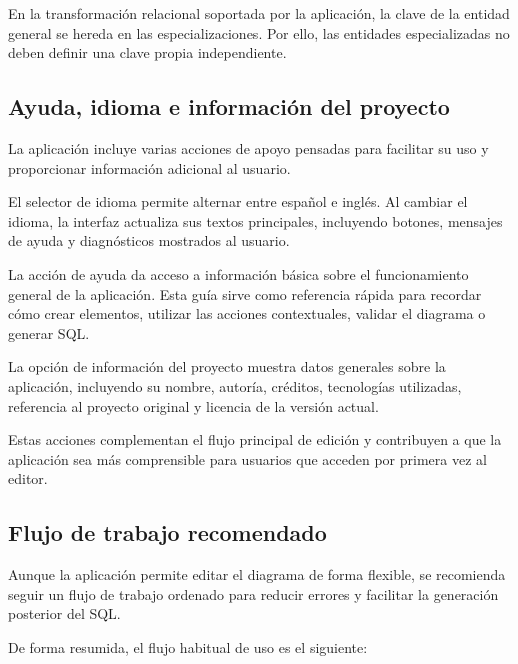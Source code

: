 En la transformación relacional soportada por la aplicación, la clave de la entidad general se hereda en las especializaciones. Por ello, las entidades especializadas no deben definir una clave propia independiente.

\subsection{Ayuda, idioma e información del proyecto}

La aplicación incluye varias acciones de apoyo pensadas para facilitar su uso y proporcionar información adicional al usuario.

El selector de idioma permite alternar entre español e inglés. Al cambiar el idioma, la interfaz actualiza sus textos principales, incluyendo botones, mensajes de ayuda y diagnósticos mostrados al usuario.

La acción de ayuda da acceso a información básica sobre el funcionamiento general de la aplicación. Esta guía sirve como referencia rápida para recordar cómo crear elementos, utilizar las acciones contextuales, validar el diagrama o generar SQL.

La opción de información del proyecto muestra datos generales sobre la aplicación, incluyendo su nombre, autoría, créditos, tecnologías utilizadas, referencia al proyecto original y licencia de la versión actual.


Estas acciones complementan el flujo principal de edición y contribuyen a que la aplicación sea más comprensible para usuarios que acceden por primera vez al editor.

\subsection{Flujo de trabajo recomendado}

Aunque la aplicación permite editar el diagrama de forma flexible, se recomienda seguir un flujo de trabajo ordenado para reducir errores y facilitar la generación posterior del SQL.

De forma resumida, el flujo habitual de uso es el siguiente:

